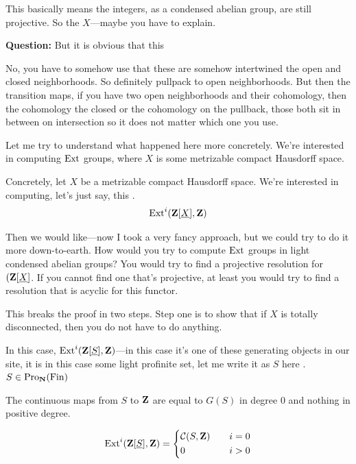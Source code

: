 This basically means the integers, as a condensed abelian group, are still projective. So the $X$---maybe you have to explain. 


\textbf{Question:} But it is obvious that this 

No, you have to somehow use that these are somehow intertwined  the open and closed neighborhoods. So definitely pullpack to open neighborhoods. 
But then the transition maps, if you have two open neighborhoods and their cohomology, then the cohomology the closed or the cohomology on the pullback, those both sit in between on intersection so it does not matter which one you use. 

Let me try to understand what happened here more concretely. We're interested in computing $\operatorname{Ext}$ groups, where $X$ is some metrizable compact Hausdorff space. 

Concretely, let $X$ be a metrizable compact Hausdorff space.
We're interested in computing, let's just say, this .
\begin{align*}
\operatorname{Ext}^i(\mathbf Z[\underline{X}],\mathbf Z)
\end{align*}

Then we would like---now I took a very fancy approach, but we could try to do it more down-to-earth. 
How would you try to compute $\operatorname{Ext}$ groups in light condensed abelian groups? 
You would try to find a projective resolution for $(\mathbf Z[\underline{X}]$. If you cannot find one that's projective, at least you would try to find a resolution that is acyclic for this functor.

This breaks the proof in two steps. Step one is to show that if $X$ is totally disconnected, then you do not have to do anything. 

% 
In this case, $\operatorname{Ext}^i(\mathbf Z[\underline{S}],\mathbf Z)$---in this case it's one of these generating objects in our site, it is in this case some light profinite set, let me write it as $S$ here .  $S \in \operatorname{Pro}_\mathbf N (\operatorname{Fin})$

The continuous maps from $S$ to $\mathbf Z$ are equal to $G(S)$ in degree $0$ and nothing in positive degree.

\begin{align*}
	\operatorname{Ext}^i(\mathbf Z[\underline{S}],\mathbf Z) = 
	\left\{
		\begin {aligned}
			& \mathcal{C}(S,\mathbf Z) \quad & i = 0 \\
			& 0 \quad & i > 0
		\end{aligned}
	\right.
\end{align*}


